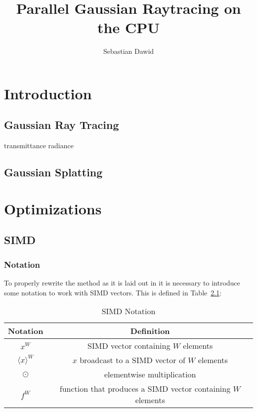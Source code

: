 \documentclass[a4paper, 11pt]{memoir}
\title{Parallel Gaussian Raytracing on the CPU}
\author{Sebastian Dawid}
\begin{document}
    \frontmatter
    \smarttitle
    \newpage
    \tableofcontents*

    \clearpage
    \thispagestyle{plain}
    \abstractintoc
    \begin{abstract}
        \lipsum[1]
    \end{abstract}

    \mainmatter
    \chapter{Introduction}
    \section{Gaussian Ray Tracing}
    \cite{Rhodin:2015}
    \gls{transmittance}
    \gls{radiance}
    \section{Gaussian Splatting}
    \cite{kerbl3Dgaussians}
    \lipsum[1]
    \lipsum[2]
    \lipsum[3]
    \lipsum[4]
    \lipsum[5]

    \chapter{Optimizations}
    \section{SIMD}
    \subsection{Notation}
    To properly rewrite the method as it is laid out in \cite{Rhodin:2015} it is
    necessary to introduce some notation to work with SIMD vectors. This is
    defined in Table~\ref{tab:notation}:
    \begin{table}[h]
        \centering
        \begin{tabular}{|c|c|}
            \hline
            Notation & Definition \\
            \hline
            \rowcolor{lightgray}
            $x^W$ & SIMD vector containing $W$ elements\\
            $\langle x \rangle^W$ & $x$ broadcast to a SIMD vector of $W$ elements\\
            \rowcolor{lightgray}
            $\odot$ & elementwise multiplication\\
            $f^W$ & function that produces a SIMD vector containing $W$ elements\\\hline
        \end{tabular}
        \caption{SIMD Notation}
        \label{tab:notation}
    \end{table}
\end{document}
